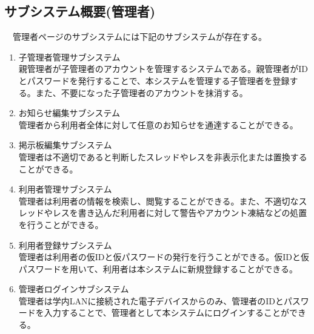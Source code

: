 \documentclass[a4j]{jarticle}
\begin{document}
\subsection{サブシステム概要(管理者)}
　管理者ページのサブシステムには下記のサブシステムが存在する。
\begin{enumerate}
  \item 子管理者管理サブシステム\\
  親管理者が子管理者のアカウントを管理するシステムである。親管理者がIDとパスワードを発行することで、本システムを管理する子管理者を登録する。また、不要になった子管理者のアカウントを抹消する。


  \item お知らせ編集サブシステム\\
  管理者から利用者全体に対して任意のお知らせを通達することができる。


  \item 掲示板編集サブシステム\\
  管理者は不適切であると判断したスレッドやレスを非表示化または置換することができる。


  \item 利用者管理サブシステム\\
  管理者は利用者の情報を検索し、閲覧することができる。また、不適切なスレッドやレスを書き込んだ利用者に対して警告やアカウント凍結などの処置を行うことができる。


  \item 利用者登録サブシステム\\
  管理者は利用者の仮IDと仮パスワードの発行を行うことができる。仮IDと仮パスワードを用いて、利用者は本システムに新規登録することができる。


  \item 管理者ログインサブシステム\\
  管理者は学内LANに接続された電子デバイスからのみ、管理者のIDとパスワードを入力することで、管理者として本システムにログインすることができる。
\end{enumerate}
\end{document}
